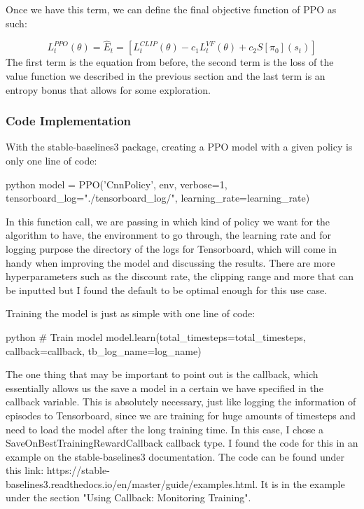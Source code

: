 \documentclass{article}
\numberwithin{equation}{section}
\numberwithin{equation}{section}
\begin{document}
Once we have this term, we can define the final objective function of PPO as such:

$$
L_t^{PPO}(\theta) = \hat{E}_t = \left[L_t^{CLIP}(\theta) - c_1 L_t^{VF}(\theta) + c_2 S[\pi_0](s_t) \right]
$$ 
The first term is the equation from before, the second term is the loss of the value function we described in the previous section and the last term is an entropy bonus that allows for some exploration.



\subsubsection*{Code Implementation}
With the stable-baselines3 package, creating a PPO model with a given policy is only one line of code:

\begin{mintedbox}{python}
model = PPO('CnnPolicy', env, verbose=1, tensorboard_log="./tensorboard_log/", learning_rate=learning_rate)
\end{mintedbox}

In this function call, we are passing in which kind of policy we want for the algorithm to have, the environment to go through, the learning rate and for logging purpose the directory of the logs for Tensorboard, which will come in handy when improving the model and discussing the results. There are more hyperparameters such as the discount rate, the clipping range and more that can be inputted but I found the default to be optimal enough for this use case.

Training the model is just as simple with one line of code:

\begin{mintedbox}{python}
# Train model
model.learn(total_timesteps=total_timesteps, callback=callback, tb_log_name=log_name)
\end{mintedbox}

The one thing that may be important to point out is the callback, which essentially allows us the save a model in a certain we have specified in the callback variable. This is absolutely necessary, just like logging the information of episodes to Tensorboard, since we are training for huge amounts of timesteps and need to load the model after the long training time. In this case, I chose a SaveOnBestTrainingRewardCallback callback type. I found the code for this in an example on the stable-baselines3 documentation. The code can be found under this link: https://stable-baselines3.readthedocs.io/en/master/guide/examples.html. It is in the example under the section "Using Callback: Monitoring Training".
\end{document}
